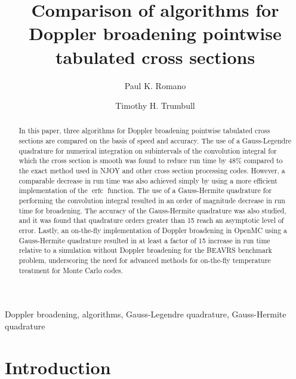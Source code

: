 \documentclass[3p,authoryear]{elsarticle}
\DeclareMathOperator\erfc{erfc}
\begin{document}
\title{Comparison of algorithms for Doppler broadening pointwise tabulated cross
  sections}

\author[bmpc]{Paul K. Romano}

\author[bmpc]{Timothy H. Trumbull}

\address[bmpc]{Bechtel Marine Propulsion Corporation -- Knolls Atomic Power
  Laboratory \\ P.O. Box 1072, Schenectady, NY 12301, United States}

\begin{abstract}
  In this paper, three algorithms for Doppler broadening pointwise tabulated
  cross sections are compared on the basis of speed and accuracy. The use of a
  Gauss-Legendre quadrature for numerical integration on subintervals of the
  convolution integral for which the cross section is smooth was found to reduce
  run time by 48\% compared to the exact method used in NJOY and other cross
  section processing codes. However, a comparable decrease in run time was also
  achieved simply by using a more efficient implementation of the $\erfc$
  function. The use of a Gauss-Hermite quadrature for performing the convolution
  integral resulted in an order of magnitude decrease in run time for
  broadening. The accuracy of the Gauss-Hermite quadrature was also studied, and
  it was found that quadrature orders greater than 15 reach an asymptotic level
  of error. Lastly, an on-the-fly implementation of Doppler broadening in OpenMC
  using a Gauss-Hermite quadrature resulted in at least a factor of 15 increase
  in run time relative to a simulation without Doppler broadening for the BEAVRS
  benchmark problem, underscoring the need for advanced methods for on-the-fly
  temperature treatment for Monte Carlo codes.
\end{abstract}

\begin{keyword}
  Doppler broadening, algorithms, Gauss-Legendre quadrature, Gauss-Hermite
  quadrature
\end{keyword}

\maketitle

\section{Introduction}
\end{document}
